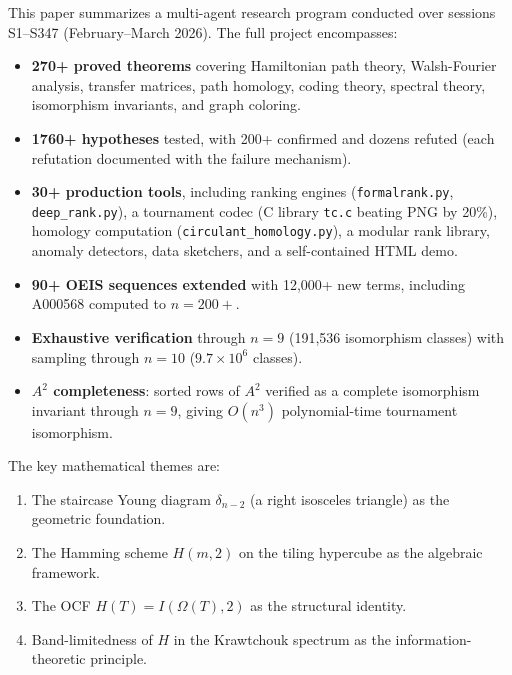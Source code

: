 \documentclass[11pt,a4paper]{article}
\theoremstyle{definition}
\theoremstyle{remark}
\begin{document}
This paper summarizes a multi-agent research program conducted over sessions S1--S347 (February--March 2026). The full project encompasses:

\begin{itemize}
\item \textbf{270+ proved theorems} covering Hamiltonian path theory, Walsh-Fourier analysis, transfer matrices, path homology, coding theory, spectral theory, isomorphism invariants, and graph coloring.
\item \textbf{1760+ hypotheses} tested, with 200+ confirmed and dozens refuted (each refutation documented with the failure mechanism).
\item \textbf{30+ production tools}, including ranking engines (\texttt{formalrank.py}, \texttt{deep\_rank.py}), a tournament codec (C library \texttt{tc.c} beating PNG by 20\%), homology computation (\texttt{circulant\_homology.py}), a modular rank library, anomaly detectors, data sketchers, and a self-contained HTML demo.
\item \textbf{90+ OEIS sequences extended} with 12,000+ new terms, including A000568 computed to $n = 200+$.
\item \textbf{Exhaustive verification} through $n = 9$ (191,536 isomorphism classes) with sampling through $n = 10$ ($9.7 \times 10^6$ classes).
\item \textbf{$A^2$ completeness}: sorted rows of $A^2$ verified as a complete isomorphism invariant through $n = 9$, giving $O(n^3)$ polynomial-time tournament isomorphism.
\end{itemize}

The key mathematical themes are:
\begin{enumerate}
\item The staircase Young diagram $\delta_{n-2}$ (a right isosceles triangle) as the geometric foundation.
\item The Hamming scheme $H(m, 2)$ on the tiling hypercube as the algebraic framework.
\item The OCF $H(T) = I(\Omega(T), 2)$ as the structural identity.
\item Band-limitedness of $H$ in the Krawtchouk spectrum as the information-theoretic principle.
\end{enumerate}
\end{document}

